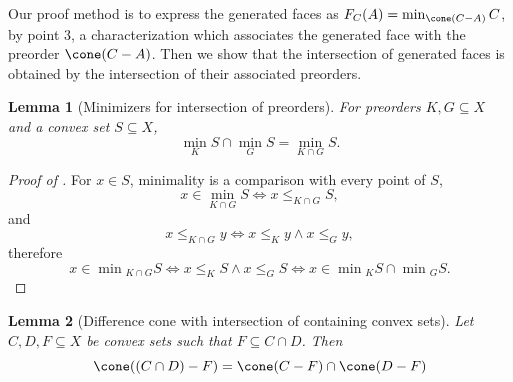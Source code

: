 \documentclass{article}
\theoremstyle{plain}
\newtheorem{lemma}[lemma]{Lemma}
\theoremstyle{definition}
\theoremstyle{remark}
\begin{document}
Our proof method is to express the generated faces as 
$F_C(A) = \min_{\cone(C-A)}C$, by
 point 3, 
a characterization which associates the generated face with the preorder $\cone(C-A)$. Then we show that the intersection of generated faces is obtained by the intersection of their associated preorders. 
\begin{lemma}[Minimizers for intersection of preorders]
\label{loc:minimizers_for_intersection_of_preorders.statement}
For preorders $K, G \subseteq X$ and a convex set $S \subseteq X$,
\begin{equation*}
\min_{K}S \cap \min_{G}S = \min_{K \cap G} S.
\end{equation*}
\end{lemma}
\begin{proof}[\hypertarget{loc:minimizers_for_intersection_of_preorders.proof}{}Proof of ]

For $x \in S$, minimality is a comparison with every point of $S$,
\begin{equation*}
x \in \min_{K \cap G}S \iff x \le_{K \cap G} S,
\end{equation*}
and
\begin{equation*}
x \le_{K \cap G} y \iff x \le_{K} y \land x \le_{G} y,
\end{equation*}
therefore
\begin{equation*}
x \in \min{}_{K \cap G}S \iff x \le_{K} S \land x \le_{G} S \iff x \in \min{}_{K}S \cap \min{}_{G}S.
\end{equation*}
\end{proof}
\begin{lemma}[Difference cone with intersection of containing convex sets]
\label{loc:difference_cone_with_intersection_of_containing_convex_sets.statement}
Let $C, D, F \subseteq X$ be convex sets such that $F \subseteq C \cap D$.
Then
\begin{equation*}
\cone((C \cap D) - F) = \cone(C-F) \cap \cone(D-F)
\end{equation*}
\end{lemma}
\end{document}
